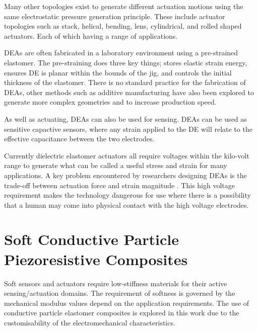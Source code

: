 Many other topologies exist to generate different actuation motions using the same electrostatic pressure generation principle. These include actuator topologies such as stack\citep{Hau2018,Kovacs2009}, helical\citep{Carpi2012}, bending\citep{Pfeil2020}, lens\citep{Ghilardi2019}, cylindrical, and rolled shaped actuators\citep{Amin2018}. Each of which having a range of applications.

DEAs are often fabricated in a laboratory environment using a pre-strained elastomer. The pre-straining does three key things; stores elastic strain energy, ensures DE is planar within the bounds of the jig, and controls the initial thickness of the elastomer. There is no standard practice for the fabrication of DEAs, other methods such as additive manufacturing have also been explored to generate more complex geometries and to increase production speed\citep{Park2018,McCoul2017}.

As well as actuating, DEAs can also be used for sensing. DEAs can be used as sensitive capactive sensors, where any strain applied to the DE will relate to the effective capacitance between the two electrodes\citep{Jung2008,Goulbourne2007,Gisby2013}. 

Currently dielectric elastomer actuators all require voltages within the kilo-volt range to generate what can be called a useful stress and strain for many applications. A key problem encountered by researchers designing DEAs is the trade-off between actuation force and strain magnitude \citep{Hau2018}. This high voltage requirement makes the technology dangerous for use where there is a possibility that a human may come into physical contact with the high voltage electrodes.



\section{Soft Conductive Particle Piezoresistive Composites}
\label{sec:Soft Piezoresistive Composites}
Soft sensors and actuators require low-stiffness materials for their active sensing/actuation domains. The requirement of softness is governed by the mechanical modulus values depend on the application requirements. The use of conductive particle elastomer composites is explored in this work due to the customisability of the electromechanical characteristics.

